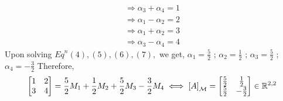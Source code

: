 \documentclass[a4paper]{article}
\begin{document}
\begin{qalist}
\begin{equation}
			\end{equation}
			\begin{align}
				\Rightarrow {\alpha}_{3} + {\alpha}_{4} = 1 \\
				\Rightarrow {\alpha}_{1} - {\alpha}_{2} = 2\\
				\Rightarrow {\alpha}_{1} + {\alpha}_{2} = 3 \\
				\Rightarrow {\alpha}_{3} - {\alpha}_{4} = 4
			\end{align}
			Upon solving ${Eq}^{n} (4), (5), (6), (7), $ we get, ${\alpha}_{1} = \frac{5}{2}$ ; ${\alpha}_{2} = \frac{1}{2}$ ; ${\alpha}_{3} = \frac{5}{2}$ ; ${\alpha}_{4} = -\frac{3}{2}$
			Therefore, 
			\begin{equation} \notag
				\begin{bmatrix}1 & 2 \\ 3 & 4\end{bmatrix}= \frac{5}{2}{M}_{1} + \frac{1}{2}{M}_{2} + \frac{5}{2}{M}_{3} - \frac{3}{2}{M}_{4} \iff {[A]}_{\mathcal{M}} = \begin{bmatrix}\frac{5}{2} & \frac{1}{2} \\ \frac{5}{2} & -\frac{3}{2}\end{bmatrix} \in {\mathbb{R}}^{2,2}
			\end{equation}
	\end{qalist}
\end{document}
